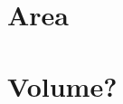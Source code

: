 %     
%     

%
\begin{figure}[htpb]%
    \centering%
    \caption{}%
\end{figure}%

\section{Area}
\section{Volume?}

